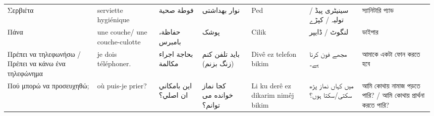 \begin{longtable}{p{3.5cm} p{3.5cm} p{3.5cm} p{3.5cm} p{3.5cm} p{3.5cm} p{3.5cm} }
 Σερβιέτα                                                                                                                      & serviette hygiénique                                                                            & فوطة صحية                                                                             & نوار بهداشتی                                                & Ped                                                                                & سینیٹری پیڈ / تولیہ / کپڑے                                                     & স্যানিটারি প্যাড                                                  \\
 Πάνα                                                                                                                          & une couche/ une couche-culotte                                                                  & حفاظة، بامبرس                                                                         & پوشک                                                        & Cilik                                                                              & لنگوٹ / ڈایپر                                                                  & ডাইপার                                                            \\
 Πρέπει να τηλεφωνήσω / Πρέπει να κάνω ένα τηλεφώνημα                                                                          & je dois téléphoner.                                                                             & بحاجة اجراء مكالمة                                                                    & باید تلفن کنم (زنگ بزنم)                                    & Divê ez telefon bikim                                                              & مجھے فون کرنا ہے۔                                                              & আমাকে একটা ফোন করতে হবে                                           \\
 Πού μπορώ να προσευχηθώ;                                                                                                      & où puis-je prier?                                                                               & اين بامكاني ان اصلي؟                                                                  & کجا نماز خوانده می توانم؟                                   & Li ku derê ez dikarim nimêj bikim                                                  & میں کہاں نماز پڑھ سکتی/سکتا ہوں؟                                               & আমি কোথায় নামাজ পড়তে পারি? / আমি কোথায় প্রার্থনা করতে পারি?       \\

\end{longtable}
